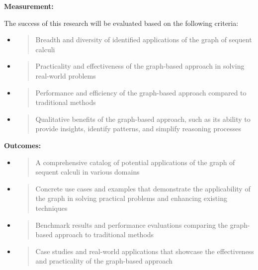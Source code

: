\textbf{Measurement:}

The success of this research will be evaluated based on the following
criteria:

\begin{itemize}
\item
  \begin{quote}
  Breadth and diversity of identified applications of the graph of
  sequent calculi
  \end{quote}
\item
  \begin{quote}
  Practicality and effectiveness of the graph-based approach in solving
  real-world problems
  \end{quote}
\item
  \begin{quote}
  Performance and efficiency of the graph-based approach compared to
  traditional methods
  \end{quote}
\item
  \begin{quote}
  Qualitative benefits of the graph-based approach, such as its ability
  to provide insights, identify patterns, and simplify reasoning
  processes
  \end{quote}
\end{itemize}

\textbf{Outcomes:}

\begin{itemize}
\item
  \begin{quote}
  A comprehensive catalog of potential applications of the graph of
  sequent calculi in various domains
  \end{quote}
\item
  \begin{quote}
  Concrete use cases and examples that demonstrate the applicability of
  the graph in solving practical problems and enhancing existing
  techniques
  \end{quote}
\item
  \begin{quote}
  Benchmark results and performance evaluations comparing the
  graph-based approach to traditional methods
  \end{quote}
\item
  \begin{quote}
  Case studies and real-world applications that showcase the
  effectiveness and practicality of the graph-based approach
  \end{quote}
\end{itemize}


